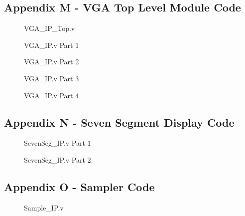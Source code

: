 \documentclass[a4paper,12pt]{article}
\begin{document}
\subsection{Appendix M - VGA Top Level Module Code}
\begin{figure}[H]
	\centering
	
		\caption{VGA\_IP\_Top.v}
\end{figure}
\newpage
\begin{figure}[H]
	\centering
	
		\caption{VGA\_IP.v Part 1}
\end{figure}
\newpage
\begin{figure}[H]
	\centering
	
		\caption{VGA\_IP.v Part 2}
\end{figure}
\newpage
\begin{figure}[H]
	\centering
	
		\caption{VGA\_IP.v Part 3}
\end{figure}
\begin{figure}[H]
	\centering
	
		\caption{VGA\_IP.v Part 4}
\end{figure}
\newpage
\subsection{Appendix N - Seven Segment Display Code}
\begin{figure}[H]
	\centering
	
		\caption{SevenSeg\_IP.v Part 1}
\end{figure}
\newpage
\begin{figure}[H]
	\centering
	
		\caption{SevenSeg\_IP.v Part 2}
\end{figure}
\newpage
\subsection{Appendix O - Sampler Code}
\begin{figure}[H]
	\centering
	
		\caption{Sample\_IP.v}
\end{figure}
\newpage
\end{document}
